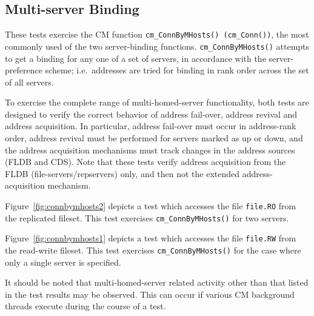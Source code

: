 \subsection{Multi-server Binding}
\label{subsec:connbymhosts}

These tests exercise the CM function
{\tt cm\_ConnByMHosts() (cm\_Conn())}, the most commonly used of the
two server-binding functions.
{\tt cm\_ConnByMHosts()} attempts to get a binding for any one of
a set of servers, in accordance with the server-preference scheme;
i.e.\ addresses are tried for binding in rank order across the set of
all servers.

To exercise the complete range of multi-homed-server functionality,
both tests are designed to verify the correct behavior of
address fail-over, address revival and address acquisition.
In particular, address fail-over must occur in address-rank order,
address revival must be performed for servers marked as up or down,
and the address acquisition mechanisms must track changes in the
address sources (FLDB and CDS).  Note that these tests verify address
acquisition from the FLDB (file-servers/repservers) only, and
then not the extended address-acquisition mechanism.

Figure~\ref{fig:connbymhosts2} depicts a test which
accesses the file {\tt file.RO} from the replicated fileset.
This test exercises {\tt cm\_ConnByMHosts()} for two servers.

Figure~\ref{fig:connbymhosts1} depicts a test which
accesses the file {\tt file.RW} from the read-write fileset.
This test exercises {\tt cm\_ConnByMHosts()} for the case where only
a single server is specified.

It should be noted that multi-homed-server related activity other
than that listed in the test results may be observed.  This can
occur if various CM background threads execute during the course
of a test.

